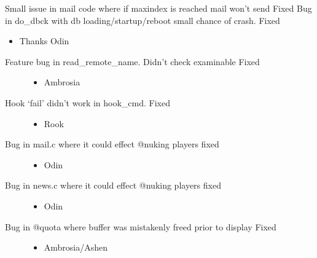 \documentclass[letterpaper,10pt,english]{sphinxmanual}
\begin{document}
\sphinxAtStartPar
Small issue in mail code where if max\sphinxhyphen{}index is reached mail won’t send \sphinxhyphen{} Fixed
Bug in do\_dbck with db loading/startup/reboot \sphinxhyphen{} small chance of crash. \sphinxhyphen{}Fixed
\begin{itemize}
\item {} 
\sphinxAtStartPar
Thanks Odin

\end{itemize}
\begin{description}
\item[{Feature bug in read\_remote\_name.  Didn’t check examinable \sphinxhyphen{} Fixed}] \leavevmode\begin{itemize}
\item {} 
\sphinxAtStartPar
Ambrosia

\end{itemize}

\item[{Hook ‘fail’ didn’t work in hook\_cmd.  \sphinxhyphen{} Fixed}] \leavevmode\begin{itemize}
\item {} 
\sphinxAtStartPar
Rook

\end{itemize}

\item[{Bug in mail.c where it could effect @nuking players \sphinxhyphen{} fixed}] \leavevmode\begin{itemize}
\item {} 
\sphinxAtStartPar
Odin

\end{itemize}

\item[{Bug in news.c where it could effect @nuking players \sphinxhyphen{} fixed}] \leavevmode\begin{itemize}
\item {} 
\sphinxAtStartPar
Odin

\end{itemize}

\item[{Bug in @quota where buffer was mistakenly freed prior to display \sphinxhyphen{} Fixed}] \leavevmode\begin{itemize}
\item {} 
\sphinxAtStartPar
Ambrosia/Ashen

\end{itemize}

\end{description}
\end{document}
